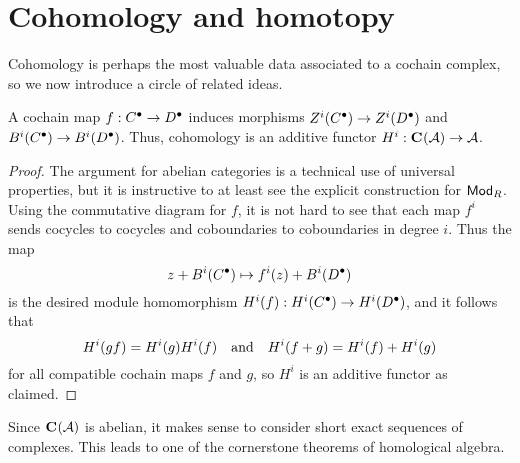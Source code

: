 \section{Cohomology and homotopy}
\label{sect_cohomology_homotopy}

Cohomology is perhaps the most valuable data associated to a cochain
complex, so we now introduce a circle of related ideas.

\begin{proposition}
  \label{prop_cochain_map_induced_cohomology}
  A cochain map $f: {{C}}^{\bullet} \to {{D}}^{\bullet}$ induces
  morphisms $Z^i({{C}}^{\bullet}) \to Z^i({{D}}^{\bullet})$ and
  $B^i({{C}}^{\bullet}) \to B^i({{D}}^{\bullet})$.
  Thus, cohomology is an additive functor $H^i: {\mathbf{C}}^{{}}({\mathcal{A}}) \to \mathcal{A}$.
\end{proposition}

\begin{proof}
  The argument for abelian categories is a technical use of universal
  properties, but it is instructive to at least see the explicit
  construction for ${\mathsf{Mod}}_{{R}}$.
  Using the commutative diagram for $f$, it is not hard to see that
  each map $f^i$ sends cocycles to cocycles and coboundaries to
  coboundaries in degree $i$.
  Thus the map
  \[
    z + B^i({{C}}^{\bullet}) \mapsto f^i(z) + B^i({{D}}^{\bullet})
  \]
  is the desired module homomorphism $H^i(f): H^i({{C}}^{\bullet})
  \to H^i({{D}}^{\bullet})$, and it follows that
  \[
    H^i(gf) = H^i(g) H^i(f) \quad \text{and} \quad H^i(f + g) = H^i(f) + H^i(g)
  \]
  for all compatible cochain maps $f$ and $g$, so $H^i$ is an
  additive functor as claimed.
\end{proof}



Since ${\mathbf{C}}^{{}}({\mathcal{A}})$ is abelian, it makes sense to consider short
exact sequences of complexes.
This leads to one of the cornerstone theorems of homological algebra.

